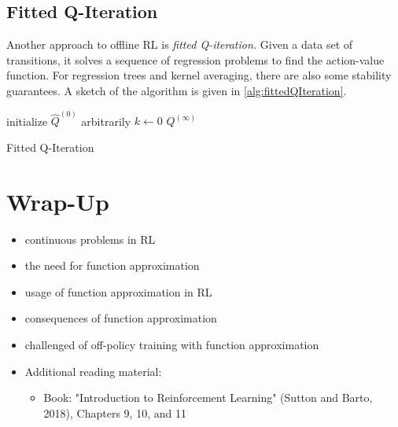 		\subsection{Fitted Q-Iteration}
			Another approach to offline \ac{RL} is \emph{fitted Q-iteration.} Given a data set of transitions, it solves a sequence of regression problems to find the action-value function. For regression trees and kernel averaging, there are also some stability guarantees. A sketch of the algorithm is given in \autoref{alg:fittedQIteration}.

			\begin{algorithm}  \DontPrintSemicolon
				initialize \(\hat{Q}^{(0)}\) arbitrarily \;
				\( k \gets 0 \) \;
				\Return \(Q^{(\infty)}\) \;
				\caption{Fitted Q-Iteration}
				\label{alg:fittedQIteration}
			\end{algorithm}

	\section{Wrap-Up}
		\begin{itemize}
			\item continuous problems in \ac{RL}
			\item the need for function approximation
			\item usage of function approximation in \ac{RL}
			\item consequences of function approximation
			\item challenged of off-policy training with function approximation
			\item Additional reading material:
				\begin{itemize}
					\item Book: "Introduction to Reinforcement Learning" (Sutton and Barto, 2018), Chapters 9, 10, and 11  %
				\end{itemize}
		\end{itemize}

